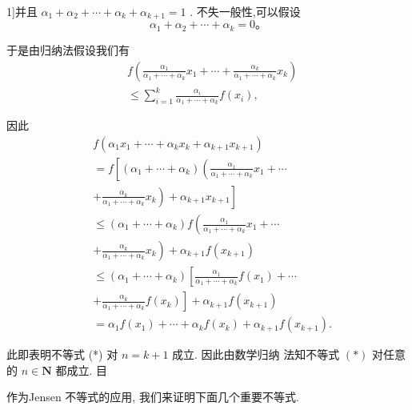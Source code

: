1]并且 ${\alpha }_{1} + {\alpha }_{2} + \cdots  + {\alpha }_{k} + {\alpha }_{k + 1} = 1$ . 不失一般性,可以假设
$${\alpha }_{1} + {\alpha }_{2} + \cdots  + {\alpha }_{k} = 0。$$

于是由归纳法假设我们有
\begin{align*}
	&f\left( {\frac{{\alpha }_{1}}{{\alpha }_{1} + \cdots  + {\alpha }_{k}}{x}_{1} + \cdots  + \frac{{\alpha }_{k}}{{\alpha }_{1} + \cdots  + {\alpha }_{k}}{x}_{k}}\right)\\
	&\leq  \mathop{\sum }\limits_{{i = 1}}^{k}\frac{{\alpha }_{i}}{{\alpha }_{1} + \cdots  + {\alpha }_{k}}f\left( {x}_{i}\right) ,
\end{align*}

因此
\begin{align*}
	&f\left( {{\alpha }_{1}{x}_{1} + \cdots  + {\alpha }_{k}{x}_{k} + {\alpha }_{k + 1}{x}_{k + 1}}\right)\\
	&= f\left\lbrack  {\left( {{\alpha }_{1} + \cdots  + {\alpha }_{k}}\right) \left( {\frac{{\alpha }_{1}}{{\alpha }_{1} + \cdots  + {\alpha }_{k}}{x}_{1} + \cdots }\right. }\right.\\
	&\left. {\left. {+\frac{{\alpha }_{k}}{{\alpha }_{1} + \cdots  + {\alpha }_{k}}{x}_{k}}\right)  + {\alpha }_{k + 1}{x}_{k + 1}}\right\rbrack\\
	&\leq  \left( {{\alpha }_{1} + \cdots  + {\alpha }_{k}}\right) f\left( {\frac{{\alpha }_{1}}{{\alpha }_{1} + \cdots  + {\alpha }_{k}}{x}_{1} + \cdots }\right.\\
	&\left. {+\frac{{\alpha }_{k}}{{\alpha }_{1} + \cdots  + {\alpha }_{k}}{x}_{k}}\right)  + {\alpha }_{k + 1}f\left( {x}_{k + 1}\right)\\
	&\leq  \left( {{\alpha }_{1} + \cdots  + {\alpha }_{k}}\right) \left\lbrack  {\frac{{\alpha }_{1}}{{\alpha }_{1} + \cdots  + {\alpha }_{k}}f\left( {x}_{1}\right)  + \cdots }\right.\\
	&\left. {+\frac{{\alpha }_{k}}{{\alpha }_{1} + \cdots  + {\alpha }_{k}}f\left( {x}_{k}\right) }\right\rbrack   + {\alpha }_{k + 1}f\left( {x}_{k + 1}\right)\\
	&= {\alpha }_{1}f\left( {x}_{1}\right)  + \cdots  + {\alpha }_{k}f\left( {x}_{k}\right)  + {\alpha }_{k + 1}f\left( {x}_{k + 1}\right) .
\end{align*}

此即表明不等式 (*) 对 $n = k + 1$ 成立. 因此由数学归纳 法知不等式 $\left( *\right)$ 对任意的 $n \in  \mathbf{N}$ 都成立. 目

作为Jensen 不等式的应用, 我们来证明下面几个重要不等式.


